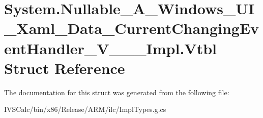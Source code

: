 \hypertarget{struct_system_1_1_nullable___a___windows___u_i___xaml___data___current_changing_event_handler___v_______impl_1_1_vtbl}{}\section{System.\+Nullable\+\_\+\+A\+\_\+\+Windows\+\_\+\+U\+I\+\_\+\+Xaml\+\_\+\+Data\+\_\+\+Current\+Changing\+Event\+Handler\+\_\+\+V\+\_\+\+\_\+\+\_\+\+Impl.\+Vtbl Struct Reference}
\label{struct_system_1_1_nullable___a___windows___u_i___xaml___data___current_changing_event_handler___v_______impl_1_1_vtbl}


The documentation for this struct was generated from the following file\+:\begin{DoxyCompactItemize}
\item 
I\+V\+S\+Calc/bin/x86/\+Release/\+A\+R\+M/ilc/Impl\+Types.\+g.\+cs\end{DoxyCompactItemize}
